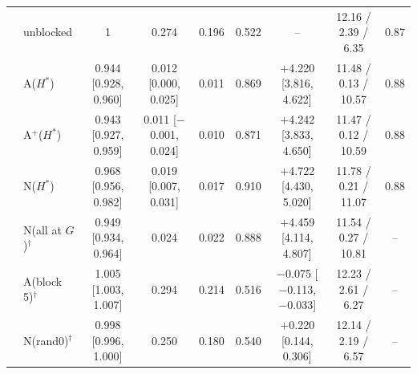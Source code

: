\begin{tabular}{@{}llccccccc@{}}
\midrule
\fmtPost{} & unblocked & 1 & 0.274 & 0.196 & 0.522 & -- & 12.16 / 2.39 / 6.35 & 0.87 \\
 & A($H^*$) & 0.944 [0.928, 0.960] & 0.012 [0.000, 0.025] & 0.011 & 0.869 & $+$4.220 [3.816, 4.622] & 11.48 / 0.13 / 10.57 & 0.88 \\
 & A$^+$($H^*$) & 0.943 [0.927, 0.959] & 0.011 [$-$0.001, 0.024] & 0.010 & 0.871 & $+$4.242 [3.833, 4.650] & 11.47 / 0.12 / 10.59 & 0.88 \\
 & N($H^*$) & 0.968 [0.956, 0.982] & 0.019 [0.007, 0.031] & 0.017 & 0.910 & $+$4.722 [4.430, 5.020] & 11.78 / 0.21 / 11.07 & 0.88 \\
 & N(all at $G$)$^\dagger$ & 0.949 [0.934, 0.964] & 0.024 & 0.022 & 0.888 & $+$4.459 [4.114, 4.807] & 11.54 / 0.27 / 10.81 & -- \\
 & A(block 5)$^\dagger$ & 1.005 [1.003, 1.007] & 0.294 & 0.214 & 0.516 & $-$0.075 [$-$0.113, $-$0.033] & 12.23 / 2.61 / 6.27 & -- \\
 & N(rand0)$^\dagger$ & 0.998 [0.996, 1.000] & 0.250 & 0.180 & 0.540 & $+$0.220 [0.144, 0.306] & 12.14 / 2.19 / 6.57 & -- \\
\bottomrule
\end{tabular}
